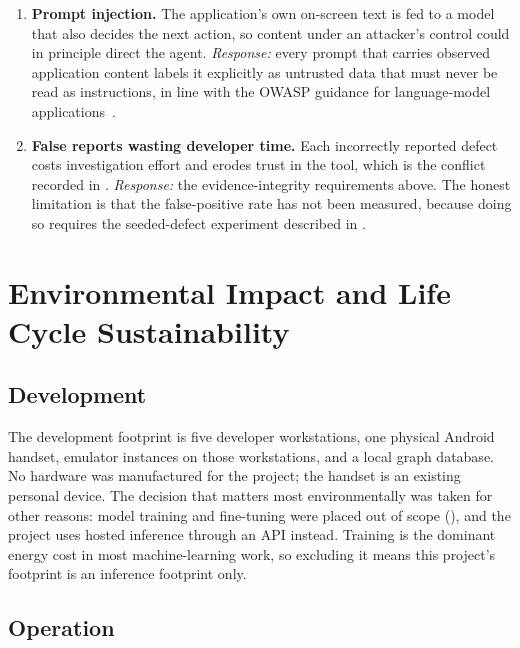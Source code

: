 \begin{enumerate}[label=\textbf{N\arabic*.},leftmargin=3.0em]
    to do is, by construction, capable of doing something irreversible.
    \emph{Response:} the safety boundary is machine-enforced (DR-07) through
    blocked control texts and blocked URL patterns, out-of-scope requirements are
    withheld from the planner's citable list, and accounts used for testing are
    disposable.
  \item \textbf{Prompt injection.} The application's own on-screen text is fed
    to a model that also decides the next action, so content under an attacker's
    control could in principle direct the agent.
    \emph{Response:} every prompt that carries observed application content
    labels it explicitly as untrusted data that must never be read as
    instructions, in line with the OWASP guidance for language-model
    applications~\cite{owaspllm}.
  \item \textbf{False reports wasting developer time.} Each incorrectly reported
    defect costs investigation effort and erodes trust in the tool, which is the
    conflict recorded in .
    \emph{Response:} the evidence-integrity requirements above. The honest
    limitation is that the false-positive rate has not been measured, because
    doing so requires the seeded-defect experiment described in
    .
\end{enumerate}

\section{Environmental Impact and Life Cycle Sustainability}
\label{sec:sustainability}

\subsection*{Development}

The development footprint is five developer workstations, one physical Android
handset, emulator instances on those workstations, and a local graph database.
No hardware was manufactured for the project; the handset is an existing
personal device. The decision that matters most environmentally was taken for
other reasons: model training and fine-tuning were placed out of scope
(), and the project uses hosted inference through an API
instead. Training is the dominant energy cost in most machine-learning work, so
excluding it means this project's footprint is an inference footprint only.

\subsection*{Operation}


